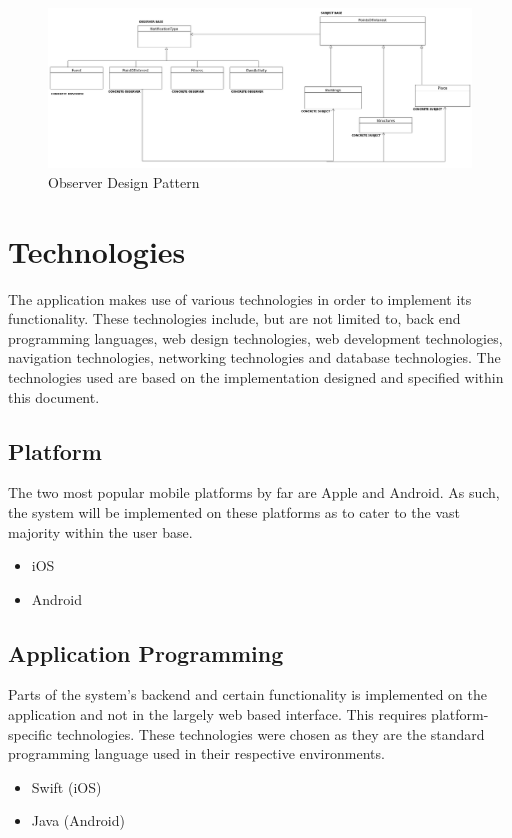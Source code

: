 \documentclass{article}
\begin{document}
	\begin{figure}
		\caption{Observer Design Pattern}
  		\includegraphics[width=650px]{Images/Observer.png}
	\end{figure}
	\FloatBarrier	

\section{Technologies}
The application makes use of various technologies in order to implement its functionality. These technologies include, but are not limited to, back end programming languages, web design technologies, web development technologies, navigation technologies, networking technologies and database technologies.  The technologies used are based on the implementation designed and specified within this document.  
	\subsection{Platform}
The two most popular mobile platforms by far are Apple and Android.  As such, the system will be implemented on these platforms as to cater to the vast majority within the user base. 
		\begin{itemize}
			\item iOS
			\item Android
		\end{itemize}
	\subsection{Application Programming}
Parts of the system's backend and certain functionality is implemented on the application and not in the largely web based interface.  This requires platform-specific technologies. These technologies were chosen as they are the standard programming language used in their respective environments.
		\begin{itemize}
			\item Swift (iOS)
			\item Java (Android)
		\end{itemize}
\end{document}

